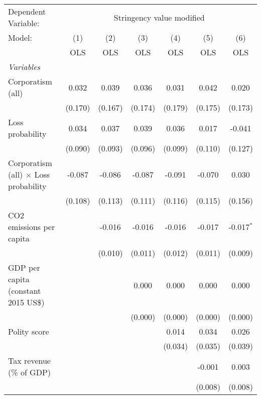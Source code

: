 
\begingroup
\centering
\begin{tabular}{lcccccc}
   \toprule
   Dependent Variable: & \multicolumn{6}{c}{Stringency value modified}\\
   Model:                                       & (1)     & (2)     & (3)     & (4)     & (5)     & (6)\\  
                                                &  OLS    & OLS     & OLS     & OLS     & OLS     & OLS\\  
   \midrule
   \emph{Variables}\\
   Corporatism (all)                            & 0.032   & 0.039   & 0.036   & 0.031   & 0.042   & 0.020\\   
                                                & (0.170) & (0.167) & (0.174) & (0.179) & (0.175) & (0.173)\\   
   Loss probability                             & 0.034   & 0.037   & 0.039   & 0.036   & 0.017   & -0.041\\   
                                                & (0.090) & (0.093) & (0.096) & (0.099) & (0.110) & (0.127)\\   
   Corporatism (all) $\times$ Loss probability  & -0.087  & -0.086  & -0.087  & -0.091  & -0.070  & 0.030\\   
                                                & (0.108) & (0.113) & (0.111) & (0.116) & (0.115) & (0.156)\\   
   CO2 emissions per capita                     &         & -0.016  & -0.016  & -0.016  & -0.017  & -0.017$^{*}$\\   
                                                &         & (0.010) & (0.011) & (0.012) & (0.011) & (0.009)\\   
   GDP per capita (constant 2015 US\$)          &         &         & 0.000   & 0.000   & 0.000   & 0.000\\   
                                                &         &         & (0.000) & (0.000) & (0.000) & (0.000)\\   
   Polity score                                 &         &         &         & 0.014   & 0.034   & 0.026\\   
                                                &         &         &         & (0.034) & (0.035) & (0.039)\\   
   Tax revenue (\% of GDP)                      &         &         &         &         & -0.001  & 0.003\\   
                                                &         &         &         &         & (0.008) & (0.008)\\   

\end{tabular}

